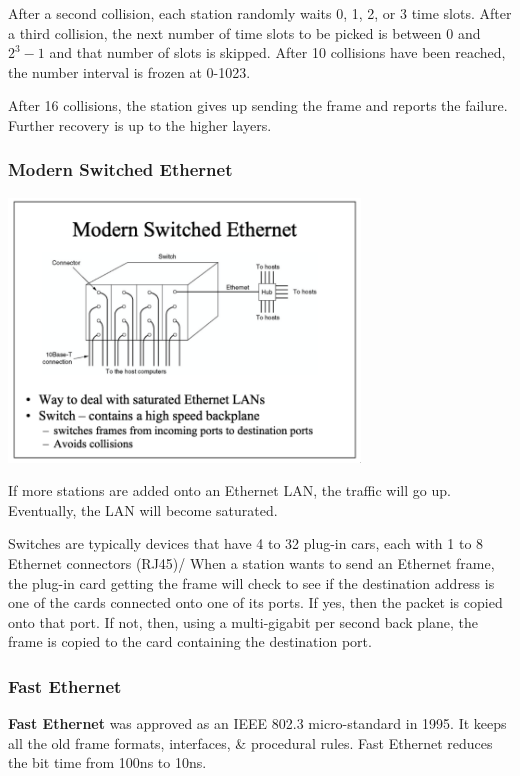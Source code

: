\documentclass[11pt]{article}
\begin{document}
After a second collision, each station randomly waits 0, 1, 2, or 3 time slots.
After a third collision, the next number of time slots to be picked is between 0 and $2^3 -1 $ and that number of 
slots is skipped.
After 10 collisions have been reached, the number interval is frozen at 0-1023.

After 16 collisions, the station gives up sending the frame and reports the failure. 
Further recovery is up to the higher layers.

\subsubsection{Modern Switched Ethernet} 
\begin{center}
    \includegraphics[width=0.7\textwidth]{modernswitchedethernet.png}
\end{center}

If more stations are added onto an Ethernet LAN, the traffic will go up. 
Eventually, the LAN will become saturated.

Switches are typically devices that have 4 to 32 plug-in cars, each with 1 to 8 Ethernet connectors (RJ45)/ 
When a station wants to send an Ethernet frame, the plug-in card getting the frame will check to see if the 
destination address is one of the cards connected onto one of its ports.
If yes, then the packet is copied onto that port. 
If not, then, using a multi-gigabit per second back plane, the frame is copied to the card containing the destination 
port.

\subsubsection{Fast Ethernet}
\textbf{Fast Ethernet} was approved as an IEEE 802.3 micro-standard in 1995.
It keeps all the old frame formats, interfaces, \& procedural rules.
Fast Ethernet reduces the bit time from 100ns to 10ns. 
\end{document}
